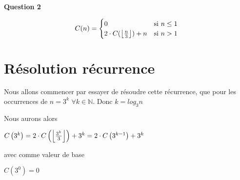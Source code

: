 \documentclass[class=article]{standalone}
\begin{document}
\centerline{\Huge \bf Question 2}
\bigskip


\[
  C(n) =
  \begin{cases}
    0 & \text{si } n \leq 1 \\
    2 \cdot C(\left \lfloor \frac{n}{3} \right \rfloor) + n & \text{si } n > 1 \\
  \end{cases}
\]

\section*{Résolution récurrence}
Nous allons commencer par essayer de résoudre cette récurrence, que pour les 
occurrences de $n = 3^k$ $\forall k \in \mathbb{N}$. Donc $k = log_3 n$

Nous aurons alors 

$C\left ( 3^k \right ) =
2 \cdot C\left ( \left \lfloor \frac{3^k}{3} \right \rfloor \right ) + 3^k =
2 \cdot C\left ( 3^{k-1} \right )+3^k$

avec comme valeur de base

$C(3^0) = 0$
\end{document}
